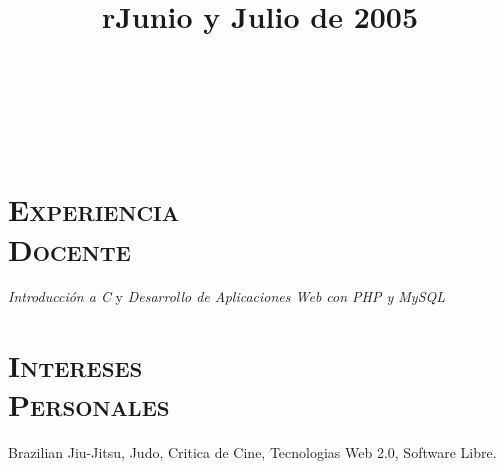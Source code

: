 \begin{resume}


\begin{formatb}
  \title{r}\\
  \\
 \body\\
\end{formatb}

 \section{\textsc{Experiencia \\ Docente}}
 \title{\textbf{Junio y Julio de 2005}}
 \begin{position}
 \emph{Introducci\'{o}n a C} y \emph{Desarrollo de Aplicaciones Web
 con PHP y MySQL}
 \end{position}




\section{\textsc{Intereses\\ Personales}}
\employer{}
\title{}
\location{} 
\dates{}
Brazilian Jiu-Jitsu, Judo, Critica de Cine, Tecnologias Web 2.0, Software Libre.
\newline     


\end{resume}
